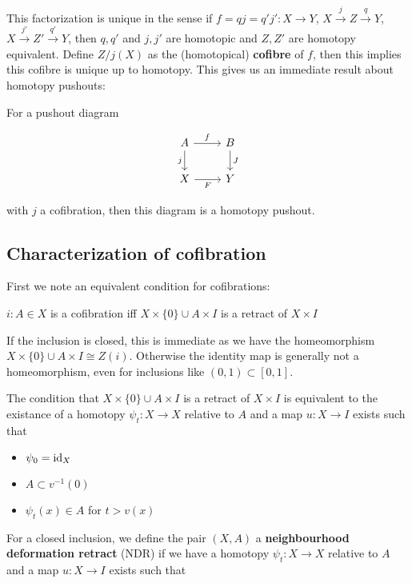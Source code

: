 This factorization is unique in the sense if $f=qj=q'j':X\to Y$, $X\overset j\to Z\overset q\to Y$, $X\overset{j'}\to Z'\overset{q'}\to Y$, then $q,q'$ and $j,j'$ are homotopic and $Z,Z'$ are homotopy equivalent. Define $Z/j(X)$ as the (homotopical) \textbf{cofibre} of $f$, then this implies this cofibre is unique up to homotopy. This gives us an immediate result about homotopy pushouts:

For a pushout diagram

\[\begin{tikzcd}
	A & B \\
	X & Y
	\arrow["f", from=1-1, to=1-2]
	\arrow["j"', from=1-1, to=2-1]
	\arrow["F"', from=2-1, to=2-2]
	\arrow["J", from=1-2, to=2-2]
\end{tikzcd}\]

with $j$ a cofibration, then this diagram is a homotopy pushout.

\subsection{Characterization of cofibration}

First we note an equivalent condition for cofibrations:

\begin{thm*} 
    $i:A\in X$ is a cofibration iff $X\times\{0\}\cup A\times I$ is a retract of $X\times I$
\end{thm*}

If the inclusion is closed, this is immediate as we have the homeomorphism $X\times\{0\}\cup A\times I\cong Z(i)$. Otherwise the identity map is generally not a homeomorphism, even for inclusions like $(0,1)\subset[0,1]$.

The condition that $X\times\{0\}\cup A\times I$ is a retract of $X\times I$ is equivalent to the existance of a homotopy $\psi_t:X\to X$ relative to $A$ and a map $u:X\to I$ exists such that

\begin{itemize}
    \item $\psi_0=\operatorname{id}_X$
    \item $A\subset v^{-1}(0)$
    \item $\psi_t(x)\in A$ for $t>v(x)$
\end{itemize}

For a closed inclusion, we define the pair $(X,A)$ a \textbf{neighbourhood deformation retract} (NDR) if we have a homotopy $\psi_t:X\to X$ relative to $A$ and a map $u:X\to I$ exists such that

